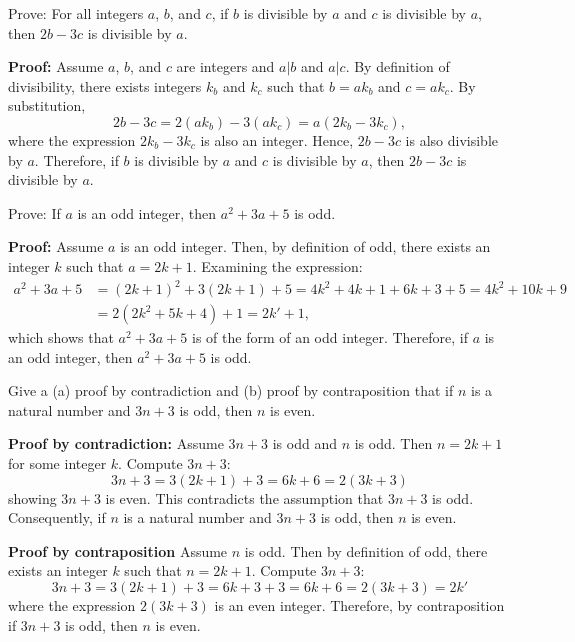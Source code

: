 \begin{questions}
 Prove: For all integers $a$, $b$, and $c$, if $b$ is divisible by $a$ and $c$ is divisible by $a$, then $2b - 3c$ is divisible by $a$.
    \ifprintanswers
        \vspace{-10pt}
    \fi
  \begin{solution} \textbf{Proof:} Assume $a$, $b$, and $c$ are integers and $a | b$ and $a | c$.  By definition of divisibility, there exists integers $k_b$ and $k_c$ such that $b = ak_b$ and $c = ak_c$.  By substitution,
    \[ 2b - 3c = 2(ak_b) - 3(ak_c) = a(2k_b - 3k_c), \]
  where the expression $2k_b - 3k_c$ is also an integer.  Hence, $2b - 3c$ is also divisible by $a$.  Therefore, if $b$ is divisible by $a$ and $c$ is divisible by $a$, then $2b-3c$ is divisible by $a$.
  \end{solution}



 Prove: If $a$ is an odd integer, then $a^2 + 3a + 5$ is odd. 
    \ifprintanswers
        \vspace{-10pt}
    \fi
  \begin{solution} \textbf{Proof:} Assume $a$ is an odd integer.  Then, by definition of odd, there exists an integer $k$ such that $a = 2k + 1$.  
  Examining the expression: 
  \begin{align*}
    a^2 + 3a + 5 &= (2k+1)^2 + 3(2k+1) + 5 =  4k^2 + 4k + 1 + 6k + 3 + 5 = 4k^2 + 10k + 9 \\
      &= 2(2k^2 + 5k + 4) + 1 = 2k' + 1,  
  \end{align*}
  which shows that $a^2 + 3a + 5$ is of the form of an odd integer. 
  Therefore, if $a$ is an odd integer, then $a^2 + 3a + 5$ is odd. 
  \end{solution}



 Give a (a) proof by contradiction and (b) proof by contraposition that if $n$ is a natural
number and $3n+3$ is odd, then $n$ is even.
    \ifprintanswers
        \vspace{-10pt}
    \fi
\begin{solution}
    \textbf{Proof by contradiction:} Assume $3n+3$ is odd and $n$ is
    odd.  Then $n=2k + 1$ for some integer $k$.  Compute
    $3n+3$:
    \[ 3n + 3 = 3(2k+1) + 3 = 6k + 6 = 2(3k + 3)\]
    showing $3n+3$ is even. This contradicts the assumption that $3n
    + 3$ is odd. Consequently, if $n$ is a natural number and $3n + 3$ is odd, then $n$ is even.

    \textbf{Proof by contraposition} Assume $n$ is odd. Then by definition of odd, there exists an integer $k$ such that $n = 2k+1$.  Compute $3n+3$:
    \[ 3n+3 = 3(2k+1) + 3 = 6k + 3 + 3 = 6k + 6 = 2(3k + 3) = 2k' \]
    where the expression $2(3k+3)$ is an even integer.  Therefore, by contraposition if $3n+3$ is odd, then $n$ is even.
\end{solution}




\end{questions}
